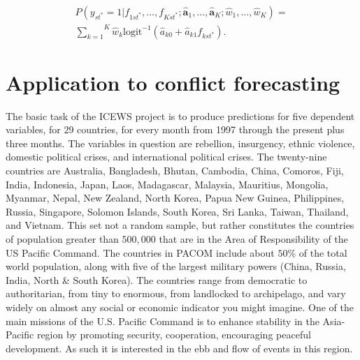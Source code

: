\documentclass[pdftex,12pt,fullpage,oneside]{amsart}
\begin{document}


\begin{equation}
\begin{array}{r}
P(y_{st^*} = 1 | f_{1st^*}, \ldots, f_{Kst^*} ;
\hat{\mathbf{a}}_1,
\ldots, \hat{\mathbf{a}}_K ; \hat{w}_1, \ldots, \hat{w}_K) = \\
\overset{K}{\underset{k=1}{\sum}} \hat{w}_k
\mbox{logit}^{-1}\left(\hat{a}_{k0} +
\hat{a}_{k1}f_{kst^*}\right).
\end{array}
\end{equation}

\section{Application to conflict forecasting}

The basic task of the ICEWS project is to produce
predictions for five dependent variables, for 29 countries, for every
month from 1997 through the present plus three months. The variables
in question are rebellion, insurgency, ethnic violence, domestic
political crises, and international political crises. The twenty-nine
countries are Australia, Bangladesh, Bhutan, Cambodia, China, Comoros,
Fiji, India, Indonesia, Japan, Laos, Madagascar, Malaysia, Mauritius,
Mongolia, Myanmar, Nepal, New Zealand, North Korea, Papua New Guinea,
Philippines, Russia, Singapore, Solomon Islands, South Korea, Sri
Lanka, Taiwan, Thailand, and Vietnam. This set not a random sample, but
rather constitutes the countries of population greater than $500,000$
that are in the Area of Responsibility of the US Pacific Command. The
countries in PACOM include about $50\%$ of the total world population,
along with five of the largest military powers (China, Russia, India,
North \& South Korea). The countries range from democratic to
authoritarian, from tiny to enormous, from landlocked to archipelago,
and vary widely on almost any social or economic indicator you might
imagine. One of the main missions of the U.S. Pacific Command is to
enhance stability in the Asia-Pacific region by promoting security,
cooperation, encouraging peaceful development. As such it is
interested in the ebb and flow of events in this region.
\end{document}
